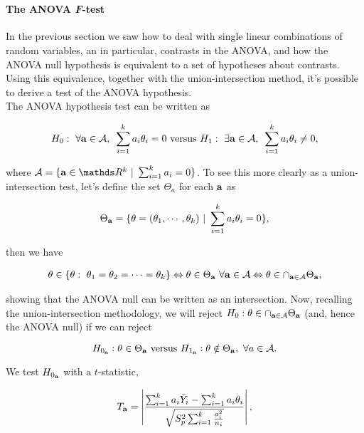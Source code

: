 \documentclass{homework}
\begin{document}
\blank \\

\paragraph{\textbf{The ANOVA \textit{F}-test}}

In the previous section we saw how to deal with single linear combinations of random variables, an in particular, contrasts in the ANOVA, and how the ANOVA null hypothesis is equivalent to a set of hypotheses about contrasts. Using this equivalence, together with the union-intersection method, it's possible to derive a test of the ANOVA hypothesis. \\

The ANOVA hypothesis test can be written as 

\begin{align*}
    H_0: \textnormal{ } \forall {\bf a} \in \mathcal{A}, \textnormal{ } \sum_{i=1}^{k} a_i \theta_i = 0 \textnormal{ versus } H_1: \textnormal{ } \exists {\bf a} \in \mathcal{A}, \textnormal{ } \sum_{i=1}^{k} a_i \theta_i \neq 0,
\end{align*}

where $\mathcal{A} = \{{\bf a} \in \R^{k} \blank | \blank \sum_{i=1}^{k} a_i = 0\}$. To see this more clearly as a union-intersection test, let's define the set $\Theta_a$ for each ${\bf a}$ as 

$$
\Theta_{\bf a} = \{\theta=(\theta_1, \cdots, \theta_k) \textnormal{ } | \textnormal{ } \sum_{i=1}^{k}a_i \theta_i = 0\},
$$

then we have 

\begin{align*}
    \theta \in \{\theta: \textnormal{ } \theta_1 = \theta_2 = \cdots =  \theta_k \} \Leftrightarrow \theta \in \Theta_{\bf a} \textnormal{ } \forall {\bf a} \in \mathcal{A} \Leftrightarrow \theta \in \cap_{{\bf a} \in \mathcal{A}} \Theta_{\bf a},
\end{align*}

showing that the ANOVA null can be written as an intersection. Now, recalling the union-intersection methodology, we will reject $H_0 : \theta \in \cap_{{\bf a} \in \mathcal{A}} \Theta_{\bf a}$ (and, hence the ANOVA null) if we can reject 

$$
H_{0_{\bf a}} : \theta \in \Theta_{\bf a} \textnormal{ versus } H_{1_{\bf a}} : \theta \notin \Theta_{\bf a}, \textnormal{ }  \forall a \in \mathcal{A}.
$$

We test $H_{0_{\bf a}}$ with a $t$-statistic, 

$$
T_{\bf a} = \left| \frac{\sum_{i=1}^k a_i \bar{Y}_i - \sum_{i=1}^k a_i \theta_i}{\sqrt{S_p^2 \sum_{i=1}^{k} \frac{a_i^2}{n_i}}} \right|,
$$
\end{document}
